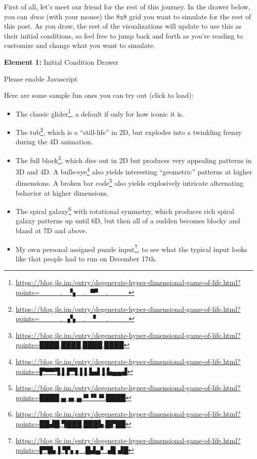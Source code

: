 \documentclass[]{article}
\renewcommand{\href}[2]{#2\footnote{\url{#1}}}
\begin{document}
First of all, let's meet our friend for the rest of this journey. In the drawer
below, you can \emph{draw} (with your mouse) the 8x8 grid you want to simulate
for the rest of this post. As you draw, the rest of the visualizations will
update to use this as their initial conditions, so feel free to jump back and
forth as you're reading to customize and change what you want to simulate.

\leavevmode\hypertarget{golDrawer}{}%
\textbf{Element 1:} Initial Condition Drawer

\leavevmode\hypertarget{golDrawerCont}{}%
Please enable Javascript

Here are some sample fun ones you can try out (click to load):

\begin{itemize}
\tightlist
\item
  The
  \href{https://blog.jle.im/entry/degenerate-hyper-dimensional-game-of-life.html?points=____._▝▖_._▀▘_.____}{classic
  glider}, a default if only for how iconic it is.
\item
  The
  \href{https://blog.jle.im/entry/degenerate-hyper-dimensional-game-of-life.html?points=____._▞▖_._▝__.____}{tub},
  which is a ``still-life'' in 2D, but explodes into a twinkling frenzy during
  the 4D animation.
\item
  The
  \href{https://blog.jle.im/entry/degenerate-hyper-dimensional-game-of-life.html?points=████.████.████.████}{full
  block}, which dies out in 2D but produces very appealing patterns in 3D and
  4D. A
  \href{https://blog.jle.im/entry/degenerate-hyper-dimensional-game-of-life.html?points=▛▀▀▜.▌▛▜▐.▌▙▟▐.▙▄▄▟}{bulls-eye}
  also yields interesting ``geometric'' patterns at higher dimensions. A
  \href{https://blog.jle.im/entry/degenerate-hyper-dimensional-game-of-life.html?points=████.▄▗▖▄.▀▝▘▀.████}{broken
  bar code} also yields explosively intricate alternating behavior at higher
  dimensions.
\item
  The
  \href{https://blog.jle.im/entry/degenerate-hyper-dimensional-game-of-life.html?points=██▟█.▜███.███▙.█▛██}{spiral
  galaxy} with rotational symmetry, which produces rich spiral galaxy patterns
  up until 6D, but then all of a sudden becomes blocky and bland at 7D and
  above.
\item
  My
  \href{https://blog.jle.im/entry/degenerate-hyper-dimensional-game-of-life.html?points=▛▜▙▐.▜▚▗_.█▟▄▘.▟▌▟█}{own
  personal assigned puzzle input}, to see what the typical input looks like that
  people had to run on December 17th.
\end{itemize}
\end{document}
